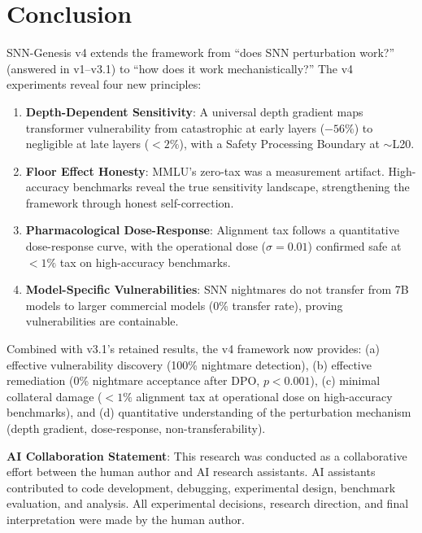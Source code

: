 \documentclass[11pt,a4paper]{article}
\begin{document}
\section{Conclusion}

SNN-Genesis v4 extends the framework from ``does SNN perturbation work?'' (answered in v1--v3.1) to ``how does it work mechanistically?'' The v4 experiments reveal four new principles:

\begin{enumerate}
    \item \textbf{Depth-Dependent Sensitivity}: A universal depth gradient maps transformer vulnerability from catastrophic at early layers ($-56\%$) to negligible at late layers ($<2\%$), with a Safety Processing Boundary at $\sim$L20.
    \item \textbf{Floor Effect Honesty}: MMLU's zero-tax was a measurement artifact. High-accuracy benchmarks reveal the true sensitivity landscape, strengthening the framework through honest self-correction.
    \item \textbf{Pharmacological Dose-Response}: Alignment tax follows a quantitative dose-response curve, with the operational dose ($\sigma = 0.01$) confirmed safe at $<1\%$ tax on high-accuracy benchmarks.
    \item \textbf{Model-Specific Vulnerabilities}: SNN nightmares do not transfer from 7B models to larger commercial models (0\% transfer rate), proving vulnerabilities are containable.
\end{enumerate}

Combined with v3.1's retained results, the v4 framework now provides: (a) effective vulnerability discovery (100\% nightmare detection), (b) effective remediation (0\% nightmare acceptance after DPO, $p < 0.001$), (c) minimal collateral damage ($<1\%$ alignment tax at operational dose on high-accuracy benchmarks), and (d) quantitative understanding of the perturbation mechanism (depth gradient, dose-response, non-transferability).

\textbf{AI Collaboration Statement}: This research was conducted as a collaborative effort between the human author and AI research assistants. AI assistants contributed to code development, debugging, experimental design, benchmark evaluation, and analysis. All experimental decisions, research direction, and final interpretation were made by the human author.
\end{document}
